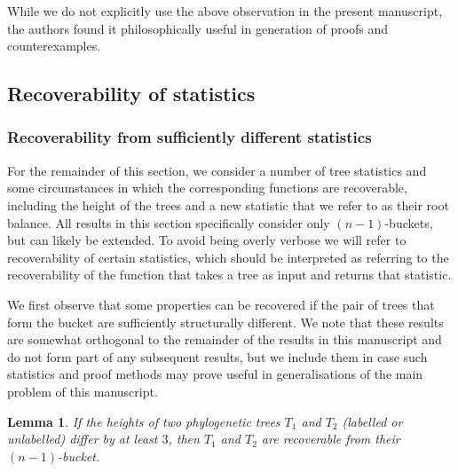 \documentclass[12pt]{article}
\newtheorem{Lemma}[Theorem]{Lemma}
\theoremstyle{definition}
\begin{document}
While we do not explicitly use the above observation in the present manuscript, the authors found it philosophically useful in generation of proofs and counterexamples.

\subsection{Recoverability of statistics}

\subsubsection{Recoverability from sufficiently different statistics}

For the remainder of this section, we consider a number of tree statistics and some circumstances in which the corresponding functions are recoverable, including the height of the trees and a new statistic that we refer to as their root balance. All results in this section specifically consider only $(n-1)$-buckets, but can likely be extended. To avoid being overly verbose we will refer to recoverability of certain statistics, which should be interpreted as referring to the recoverability of the function that takes a tree as input and returns that statistic. 

We first observe that some properties can be recovered if the pair of trees that form the bucket are sufficiently structurally different. We note that these results are somewhat orthogonal to the remainder of the results in this manuscript and do not form part of any subsequent results, but we include them in case such statistics and proof methods may prove useful in generalisations of the main problem of this manuscript. 

\begin{Lemma}
    If the heights of two phylogenetic trees $T_1$ and $T_2$ (labelled or unlabelled) differ by at least $3$, then $T_1$ and $T_2$ are recoverable from their $(n-1)$-bucket.
\end{Lemma}
\end{document}
